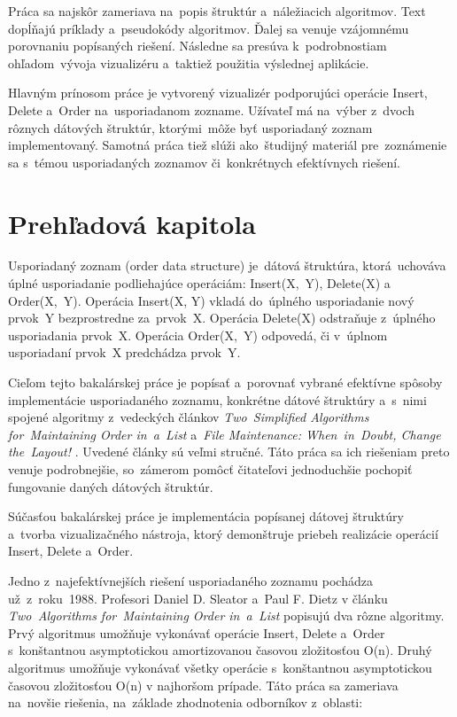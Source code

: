 \documentclass[
  digital,     %
  oneside,     %
  nosansbold,  %
  nocolorbold, %
  lof,         %
  lot,         %
]{fithesis4}
\begin{document}
Práca sa najskôr zameriava na~popis štruktúr a~náležiacich algoritmov. Text dopĺňajú príklady a~pseudokódy algoritmov. Ďalej sa venuje vzájomnému porovnaniu popísaných riešení. Následne sa presúva k~podrobnostiam ohľadom~vývoja vizualizéru a~taktiež použitia výslednej aplikácie.

Hlavným prínosom práce je vytvorený vizualizér podporujúci operácie Insert, Delete a~Order na~usporiadanom zozname. Užívateľ má na~výber z~dvoch rôznych dátových štruktúr, ktorými~môže byť usporiadaný zoznam implementovaný. Samotná práca tiež slúži ako~študijný materiál pre~zoznámenie sa s~témou usporiadaných \mbox{zoznamov} či~konkrétnych efektívnych riešení.



\chapter{Prehľadová kapitola}
Usporiadaný zoznam (order data structure) \cite{paper1_ordered_list}  je~dátová štruktúra, ktorá~uchováva úplné usporiadanie podliehajúce operáciám: Insert(X,~Y), Delete(X) a Order(X,~Y). Operácia Insert(X, Y) vkladá do~úplného usporiadanie nový prvok~Y bezprostredne za~prvok~X. Operácia Delete(X) odstraňuje z~úplného usporiadania prvok~X. Operácia Order(X,~Y) odpovedá, či v~úplnom usporiadaní prvok~X predchádza prvok~Y.

Cieľom tejto bakalárskej práce je popísať a~porovnať vybrané efektívne spôsoby implementácie usporiadaného zoznamu, konkrétne dátové štruktúry a~s~nimi spojené algoritmy z~vedeckých článkov \textit{Two~Simplified Algorithms for~Maintaining Order in~a~List} \cite{paper1_ordered_list} a~\textit{File Maintenance: When~in~Doubt, Change the~Layout!} \cite{paper2_file_maintenance}. Uvedené články sú veľmi stručné. Táto práca sa ich riešeniam preto venuje podrobnejšie, so~zámerom pomôcť čitateľovi jednoduchšie pochopiť fungovanie daných dátových štruktúr.

Súčasťou bakalárskej práce je implementácia popísanej dátovej štruktúry a~tvorba vizualizačného nástroja, ktorý demonštruje priebeh realizácie operácií Insert, Delete a~Order.

Jedno z~najefektívnejších riešení usporiadaného zoznamu pochádza už~z~roku~1988. Profesori Daniel D. Sleator a~Paul F. Dietz v článku \textit{Two~Algorithms for~Maintaining Order in~a~List} \cite{paper3_1988} popisujú dva rôzne algoritmy. Prvý algoritmus umožňuje vykonávať operácie Insert, Delete a~Order s~konštantnou asymptotickou amortizovanou časovou zložitosťou O(n). Druhý algoritmus umožňuje vykonávať všetky operácie s~konštantnou asymptotickou časovou zložitosťou O(n) v najhoršom prípade. Táto práca sa zameriava na~novšie riešenia, na~základe zhodnotenia odborníkov z~oblasti:
 \cite{paper1_ordered_list}
\end{document}
